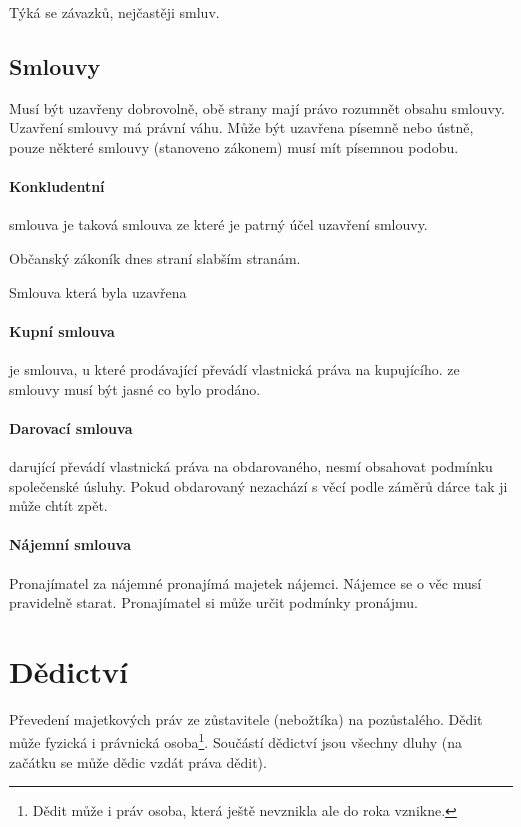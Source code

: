 \documentclass[10pt,a4paper,
twoside,%
]{report}
\begin{document}
Týká se závazků, nejčastěji smluv.

\subsection{Smlouvy}

Musí být uzavřeny dobrovolně, obě strany mají právo rozumnět obsahu smlouvy. Uzavření smlouvy má právní váhu. Může být uzavřena písemně nebo ústně, pouze některé smlouvy (stanoveno zákonem) musí mít písemnou podobu.

\paragraph{Konkludentní} smlouva je taková smlouva ze které je patrný účel uzavření smlouvy.

Občanský zákoník dnes straní slabším stranám.

Smlouva která byla uzavřena

\paragraph{Kupní smlouva} je smlouva, u které prodávající převádí vlastnická práva na kupujícího. ze smlouvy musí být jasné co bylo prodáno.

\paragraph{Darovací smlouva} darující převádí vlastnická práva na obdarovaného, nesmí obsahovat podmínku společenské úsluhy. Pokud obdarovaný nezachází s věcí podle záměrů dárce tak ji může chtít zpět.

\paragraph{Nájemní smlouva} Pronajímatel za nájemné pronajímá majetek nájemci. Nájemce se o věc musí pravidelně starat. Pronajímatel si může určit podmínky pronájmu.


\section{Dědictví}
Převedení majetkových práv ze zůstavitele (nebožtíka) na pozůstalého. Dědit může fyzická i právnická osoba\footnote{Dědit může i práv osoba, která ještě nevznikla ale do roka vznikne.}. Součástí dědictví jsou všechny dluhy (na začátku se může dědic vzdát práva dědit).
\end{document}
